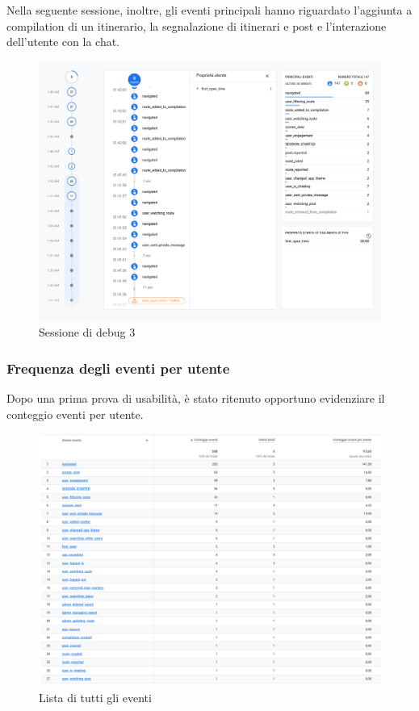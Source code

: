\documentclass{natourDoc}
\begin{document}
Nella seguente sessione, inoltre, gli eventi principali hanno riguardato l'aggiunta a compilation di 
un itinerario, la segnalazione di itinerari e post e l'interazione dell'utente con la chat.
\begin{figure}[!htbp]
	\centering
	\includegraphics[width=\textwidth]{./analytics/debug-emu2.png}
	\caption{Sessione di debug 3}
\end{figure}
\FloatBarrier

\newpage

\subsubsection{Frequenza degli eventi per utente}
Dopo una prima prova di usabilità, è stato ritenuto opportuno evidenziare il conteggio eventi per utente.

\begin{figure}[!htbp]
	\centering
	\includegraphics[width=\textwidth]{./analytics/eventi-totali.png}
	\caption{Lista di tutti gli eventi}
\end{figure}
\FloatBarrier
\end{document}
